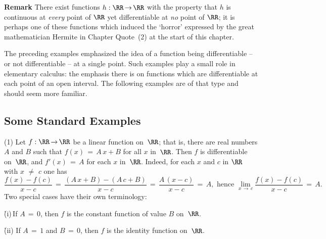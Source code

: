 
\VV

        {\bf Remark} There exist functions $h:{\RR} \,{\rightarrow}\, {\RR}$ with the property that $h$ is continuous at {\em every} point of ${\RR}$
    yet differentiable at {\em no} point of ${\RR}$; it is perhaps one of these functions which induced the `horror'
    expressed by the great mathematician Hermite in Chapter Quote~(2) at the start of this chapter. %

\VV

        The preceding examples emphasized the idea of a function being differentiable -- or not differentiable -- at a single point.
    Such examples play a small role in elementary calculus: the emphasis there is on functions which are differentiable at each point of an open interval.
    The following examples are of that type and should seem more familiar.

\V

            \subsection{\small{\bf Some Standard Examples}}
            \label{ExampE20.70}

\V

\hspace*{\parindent}(1) Let $f:{\RR} \,{\rightarrow}\, {\RR}$ be a linear function on~${\RR}$;
    that is, there are real numbers $A$ and $B$ such that $f(x) \,=\, A\,x + B$ for all $x$ in~${\RR}$.
    Then $f$ is differentiable on~${\RR}$, and $f'(x) \,=\, A$ for each $x$ in~${\RR}$. Indeed, for each $x$ and $c$ in ${\RR}$ with $x \,\,{\neq}\,\, c$ one has
        \begin{displaymath}
        \frac{f(x)-f(c)}{x-c} \,=\, \frac{(A\,x + B) - (A\,c + B)}{x-c} \,=\, \frac{A\,(x-c)}{x-c} \,=\, A, \mbox{ hence }
        \lim_{x \,{\rightarrow}\, c} \frac{f(x)-f(c)}{x-c} \,=\, A.
        \end{displaymath}
    Two special cases have their own terminology:

\VA

        \h (i)\,If $A \,=\, 0$, then $f$ is the constant function of value $B$ on~${\RR}$.

       \h (ii) If $A \,=\, 1$ and $B \,=\, 0$, then $f$ is the identity function on~${\RR}$.

